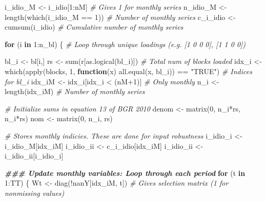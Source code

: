 \documentclass[
]{article}
\newenvironment{Shaded}{\begin{snugshade}}{\end{snugshade}}
\newcommand{\CommentTok}[1]{\textcolor[rgb]{0.56,0.35,0.01}{\textit{#1}}}
\newcommand{\ControlFlowTok}[1]{\textcolor[rgb]{0.13,0.29,0.53}{\textbf{#1}}}
\newcommand{\DecValTok}[1]{\textcolor[rgb]{0.00,0.00,0.81}{#1}}
\newcommand{\DocumentationTok}[1]{\textcolor[rgb]{0.56,0.35,0.01}{\textbf{\textit{#1}}}}
\newcommand{\FunctionTok}[1]{\textcolor[rgb]{0.00,0.00,0.00}{#1}}
\newcommand{\NormalTok}[1]{#1}
\newcommand{\OtherTok}[1]{\textcolor[rgb]{0.56,0.35,0.01}{#1}}
\newcommand{\SpecialCharTok}[1]{\textcolor[rgb]{0.00,0.00,0.00}{#1}}
\newcommand{\StringTok}[1]{\textcolor[rgb]{0.31,0.60,0.02}{#1}}
\begin{document}
\begin{Shaded}
\begin{Highlighting}[]
\NormalTok{  i\_idio\_M }\OtherTok{\textless{}{-}}\NormalTok{ i\_idio[}\DecValTok{1}\SpecialCharTok{:}\NormalTok{nM] }\CommentTok{\# Gives 1 for monthly series}
\NormalTok{  n\_idio\_M }\OtherTok{\textless{}{-}} \FunctionTok{length}\NormalTok{(}\FunctionTok{which}\NormalTok{(i\_idio\_M }\SpecialCharTok{==} \DecValTok{1}\NormalTok{)) }\CommentTok{\# Number of monthly series}
\NormalTok{  c\_i\_idio }\OtherTok{\textless{}{-}} \FunctionTok{cumsum}\NormalTok{(i\_idio) }\CommentTok{\# Cumulative number of monthly series}
  
  \ControlFlowTok{for}\NormalTok{ (i }\ControlFlowTok{in} \DecValTok{1}\SpecialCharTok{:}\NormalTok{n\_bl) \{ }\CommentTok{\# Loop through unique loadings (e.g. [1 0 0 0], [1 1 0 0])}
    
\NormalTok{    bl\_i }\OtherTok{\textless{}{-}}\NormalTok{ bl[i,]}
\NormalTok{    rs }\OtherTok{\textless{}{-}} \FunctionTok{sum}\NormalTok{(r[}\FunctionTok{as.logical}\NormalTok{(bl\_i)]) }\CommentTok{\# Total num of blocks loaded}
\NormalTok{    idx\_i }\OtherTok{\textless{}{-}} \FunctionTok{which}\NormalTok{(}\FunctionTok{apply}\NormalTok{(blocks, }\DecValTok{1}\NormalTok{, }\ControlFlowTok{function}\NormalTok{(x) }\FunctionTok{all.equal}\NormalTok{(x, bl\_i)) }\SpecialCharTok{==} \StringTok{"TRUE"}\NormalTok{) }\CommentTok{\# Indices for bl\_i}
\NormalTok{    idx\_iM }\OtherTok{\textless{}{-}}\NormalTok{ idx\_i[idx\_i }\SpecialCharTok{\textless{}}\NormalTok{ (nM}\SpecialCharTok{+}\DecValTok{1}\NormalTok{)] }\CommentTok{\# Only monthly}
\NormalTok{    n\_i }\OtherTok{\textless{}{-}} \FunctionTok{length}\NormalTok{(idx\_iM) }\CommentTok{\# Number of monthly series}
    
    \CommentTok{\# Initialize sums in equation 13 of BGR 2010}
\NormalTok{    denom }\OtherTok{\textless{}{-}} \FunctionTok{matrix}\NormalTok{(}\DecValTok{0}\NormalTok{, n\_i}\SpecialCharTok{*}\NormalTok{rs, n\_i}\SpecialCharTok{*}\NormalTok{rs)}
\NormalTok{    nom }\OtherTok{\textless{}{-}} \FunctionTok{matrix}\NormalTok{(}\DecValTok{0}\NormalTok{, n\_i, rs)}
    
    \CommentTok{\# Stores monthly indicies. These are done for input robustness}
\NormalTok{    i\_idio\_i }\OtherTok{\textless{}{-}}\NormalTok{ i\_idio\_M[idx\_iM]}
\NormalTok{    i\_idio\_ii }\OtherTok{\textless{}{-}}\NormalTok{ c\_i\_idio[idx\_iM]}
\NormalTok{    i\_idio\_ii }\OtherTok{\textless{}{-}}\NormalTok{ i\_idio\_ii[i\_idio\_i]}
    
    \DocumentationTok{\#\#\# Update monthly variables: Loop through each period}
    \ControlFlowTok{for}\NormalTok{ (t }\ControlFlowTok{in} \DecValTok{1}\SpecialCharTok{:}\NormalTok{TT) \{}
\NormalTok{      Wt }\OtherTok{\textless{}{-}} \FunctionTok{diag}\NormalTok{(}\SpecialCharTok{!}\NormalTok{nanY[idx\_iM, t]) }\CommentTok{\# Gives selection matrix (1 for nonmissing values)}
      

\end{Highlighting}
\end{Shaded}
\end{document}
